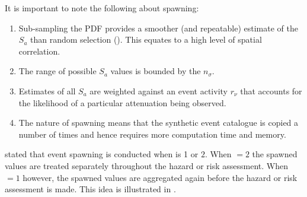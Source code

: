 It is important to note the following about spawning:
\begin{enumerate}
\item Sub-sampling the PDF provides a smoother (and repeatable)
estimate of the $S_a$ than random selection
(). This equates to a high level of
spatial correlation. \item The range of possible $S_a$ values is
bounded by the $n_\sigma$. \item Estimates of all $S_a$ are
weighted against an event activity $r_\nu$ that accounts for the
likelihood of a particular attenuation being observed. \item The
nature of spawning means that the synthetic event catalogue is
copied a number of times and hence requires more computation time
and memory.
\end{enumerate}

 stated that event spawning is conducted
when  is 1 or $2$. When
$=2$ the spawned values are treated
separately throughout the hazard or risk assessment. When
$=1$ however, the spawned values are
aggregated again before the hazard or risk assessment is made.
This idea is illustrated in .

